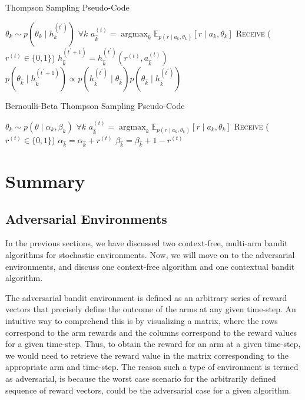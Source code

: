 \documentclass[11pt]{article}
\begin{document}
\begin{algorithm}[H]
\caption{Thompson Sampling Pseudo-Code}
\label{algo:thomp}
\begin{algorithmic}[1]
\STATE $\theta_{k} \sim p\left(\theta_{k} \mid h_{k}^{\left(t^{\prime}\right)}\right)$ $\forall k$
\STATE $a_{\hat{k}}^{(t)}=\operatorname{argmax}_{k} \mathbb{E}_{p\left(r \mid a_{k}, \theta_{k}\right)}\left[r \mid a_{k}, \theta_{k}\right]$
\STATE \textsc{Receive} ($r^{(t)}\in\{0, 1\}$)
\STATE $h_{\hat{k}}^{\left(t^{\prime}+1\right)}=h_{\hat{k}}^{\left(t^{\prime}\right)}\left(r^{(t)}, a_{\hat{k}}^{(t)}\right)$
\STATE $p\left(\theta_{\hat{k}} \mid h_{\hat{k}}^{\left(t^{\prime}+1\right)}\right) \propto p\left(h_{\hat{k}}^{\left(t^{\prime}\right)} \mid \theta_{\hat{k}}\right) p\left(\theta_{\hat{k}} \mid h_{\hat{k}}^{\left(t^{\prime}\right)}\right)$
\ENDFOR
\end{algorithmic}
\end{algorithm}

\begin{algorithm}[H]
\caption{Bernoulli-Beta Thompson Sampling Pseudo-Code}
\label{algo:BBthomp}
\begin{algorithmic}[1]
\STATE $\theta_{k} \sim p\left(\theta \mid \alpha_{k}, \beta_{k}\right)$ $\forall k$
\STATE $a_{\hat{k}}^{(t)}=\operatorname{argmax}_{k} \mathbb{E}_{p\left(r \mid a_{k}, \theta_{k}\right)}\left[r \mid a_{k}, \theta_{k}\right]$
\STATE \textsc{Receive} ($r^{(t)}\in\{0, 1\}$)
\STATE $\alpha_{\hat{k}}=\alpha_{\hat{k}}+r^{(t)}$
\STATE $\beta_{\hat{k}}=\beta_{\hat{k}}+1-r^{(t)}$
\ENDFOR
\end{algorithmic}
\end{algorithm}
\section{Summary}
\subsection{Adversarial Environments}
In the previous sections, we have discussed two context-free, multi-arm bandit algorithms for stochastic environments. Now, we will move on to the adversarial environments, and discuss one context-free algorithm and one contextual bandit algorithm. 

The adversarial bandit environment is defined as an arbitrary series of reward vectors that precisely define the outcome of the arms at any given time-step. An intuitive way to comprehend this is by visualizing a matrix, where the rows correspond to the arm rewards and the columns correspond to the reward values for a given time-step. Thus, to obtain the reward for an arm at a given time-step, we would need to retrieve the reward value in the matrix corresponding to the appropriate arm and time-step. The reason such a type of environment is termed as adversarial, is because the worst case scenario for the arbitrarily defined sequence of reward vectors, could be the adversarial case for a given algorithm.
\end{document}
